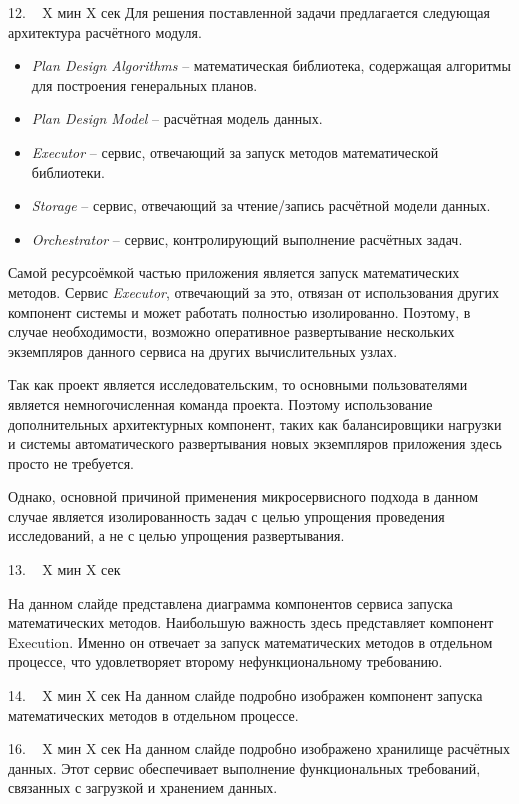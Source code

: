 \documentclass[a4paper,14pt]{extarticle}
\begin{document}
    12. ~ X мин X сек
    Для решения поставленной задачи предлагается следующая архитектура расчётного модуля.
    \begin{itemize}
        \item \textit{Plan Design Algorithms} -- математическая библиотека, содержащая алгоритмы
        для построения генеральных планов.
        \item \textit{Plan Design Model} -- расчётная модель данных.
        \item \textit{Executor} -- сервис, отвечающий за запуск методов математической библиотеки.
        \item \textit{Storage} -- сервис, отвечающий за чтение/запись расчётной модели данных.
        \item \textit{Orchestrator} -- сервис, контролирующий выполнение расчётных задач.

    \end{itemize}

    Самой ресурсоёмкой частью приложения является запуск математических методов.
    Сервис \textit{Executor}, отвечающий за это, отвязан от использования других компонент системы
    и может работать полностью изолированно.
    Поэтому, в случае необходимости, возможно оперативное развертывание нескольких экземпляров данного сервиса
    на других вычислительных узлах.

    Так как проект является исследовательским, то основными пользователями является немногочисленная команда проекта.
    Поэтому использование дополнительных архитектурных компонент,
    таких как балансировщики нагрузки и системы автоматического развертывания новых экземпляров приложения
    здесь просто не требуется.

    Однако, основной причиной применения микросервисного подхода в данном случае является изолированность задач с целью
    упрощения проведения исследований, а не с целью упрощения развертывания.

    13. ~ X мин X сек

    На данном слайде представлена диаграмма компонентов сервиса запуска математических методов.
    Наибольшую важность здесь представляет компонент Execution. Именно он отвечает за запуск математических методов
    в отдельном процессе, что удовлетворяет второму нефункциональному требованию.

    14. ~ X мин X сек
    На данном слайде подробно изображен компонент запуска математических методов в отдельном процессе.

    16. ~ X мин X сек
    На данном слайде подробно изображено хранилище расчётных данных.
    Этот сервис обеспечивает выполнение функциональных требований, связанных с загрузкой и хранением данных.
\end{document}
